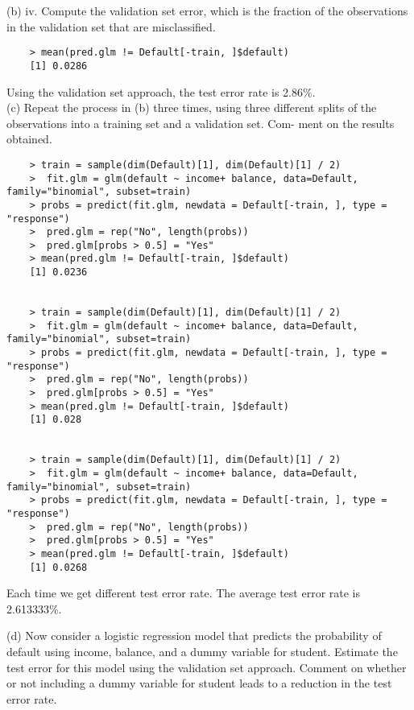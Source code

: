 \documentclass{article}
\begin{document}
\newpage

(b) iv. Compute the validation set error, which is the fraction of the observations in the validation set that are misclassified.

\begin{program}
	\begin{verbatim}
	> mean(pred.glm != Default[-train, ]$default)
	[1] 0.0286
	\end{verbatim}
\end{program}

Using the validation set approach,  the test error  rate is 2.86\%. \\



(c) Repeat the process in (b) three times, using three different splits of the observations into a training set and a validation set. Com- ment on the results obtained.

\begin{program}
	\begin{verbatim}
	> train = sample(dim(Default)[1], dim(Default)[1] / 2)
	>  fit.glm = glm(default ~ income+ balance, data=Default, family="binomial", subset=train)
	> probs = predict(fit.glm, newdata = Default[-train, ], type = "response")
	>  pred.glm = rep("No", length(probs))
	>  pred.glm[probs > 0.5] = "Yes"	
	> mean(pred.glm != Default[-train, ]$default)
	[1] 0.0236
	
	
	> train = sample(dim(Default)[1], dim(Default)[1] / 2)
	>  fit.glm = glm(default ~ income+ balance, data=Default, family="binomial", subset=train)
	> probs = predict(fit.glm, newdata = Default[-train, ], type = "response")
	>  pred.glm = rep("No", length(probs))
	>  pred.glm[probs > 0.5] = "Yes"	
	> mean(pred.glm != Default[-train, ]$default)
	[1] 0.028
	
	
	> train = sample(dim(Default)[1], dim(Default)[1] / 2)
	>  fit.glm = glm(default ~ income+ balance, data=Default, family="binomial", subset=train)
	> probs = predict(fit.glm, newdata = Default[-train, ], type = "response")
	>  pred.glm = rep("No", length(probs))
	>  pred.glm[probs > 0.5] = "Yes"	
	> mean(pred.glm != Default[-train, ]$default)
	[1] 0.0268
	\end{verbatim}
\end{program}

Each time we get different test error rate. The average test error rate is 2.613333\%.

\newpage

(d) Now consider a logistic regression model that predicts the probability of default using income, balance, and a dummy variable for student. Estimate the test error for this model using the validation set approach. Comment on whether or not including a dummy variable for student leads to a reduction in the test error rate.
\end{document}
